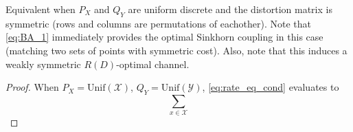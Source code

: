 \documentclass[11pt]{article}
\begin{document}
        \begin{corollary}
            Equivalent when $P_X$ and $Q_Y$ are uniform discrete and the distortion matrix is symmetric (rows and columns are permutations of eachother). Note that \eqref{eq:BA_1} immediately provides the optimal Sinkhorn coupling in this case (matching two sets of points with symmetric cost). Also, note that this induces a weakly symmetric $R(D)$-optimal channel.
        \end{corollary}
        \begin{proof}
            When $P_X = \text{Unif}(\mathcal{X})$, $Q_Y = \text{Unif}(\mathcal{Y})$, \eqref{eq:rate_eq_cond} evaluates to 
            \begin{equation}
                \sum_{x \in \mathcal{X}} 
            \end{equation}
        \end{proof}
        
\end{document}
